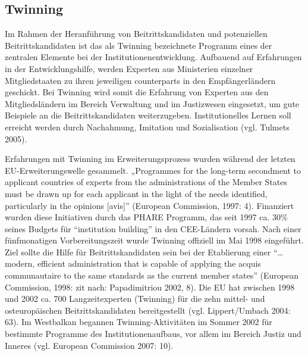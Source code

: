 \subsection{Twinning}
Im Rahmen der Heranführung von Beitrittskandidaten und potenziellen Beitrittskandidaten ist das als Twinning bezeichnete Programm eines der zentralen Elemente bei der Institutionenentwicklung. Aufbauend auf Erfahrungen in der Entwicklungshilfe, werden Experten aus Ministerien einzelner Mitgliedstaaten zu ihren jeweiligen counterparts in den Empfängerländern geschickt. Bei Twinning wird somit die Erfahrung von Experten aus den Mitgliedsländern im Bereich Verwaltung und im Justizwesen eingesetzt, um gute Beispiele an die Beitrittskandidaten weiterzugeben. Institutionelles Lernen soll erreicht werden durch Nachahmung, Imitation und Sozialisation (vgl. Tulmets 2005).
\par
Erfahrungen mit Twinning im Erweiterungsprozess wurden während der letzten EU-Erweiterungswelle gesammelt. „Programmes for the long-term secondment to applicant countries of experts from the administrations of the Member States must be drawn up for each applicant in the light of the needs identified, particularly in the opinions [avis]” (European Commission, 1997: 4). Finanziert wurden diese Initiativen durch das PHARE Programm, das seit 1997 ca. 30\% seines Budgets für “institution building” in den CEE-Ländern vorsah. Nach einer fünfmonatigen Vorbereitungszeit wurde Twinning offiziell im Mai 1998 eingeführt. Ziel sollte die Hilfe für Beitrittskandidaten sein bei der Etablierung einer “…modern, efficient administration that is capable of applying the acquis communautaire to the same standards as the current member states” (European Commission, 1998: zit nach: Papadimitriou 2002, 8). Die EU hat zwischen 1998 und 2002 ca. 700 Langzeitexperten (Twinning) für die zehn mittel- und osteuropäischen Beitrittskandidaten bereitgestellt (vgl. Lippert/Umbach 2004: 63). Im Westbalkan begannen Twinning-Aktivitäten im Sommer 2002 für bestimmte Programme des Institutionenaufbaus, vor allem im Bereich Justiz und Inneres (vgl. European Commission 2007: 10).\par

